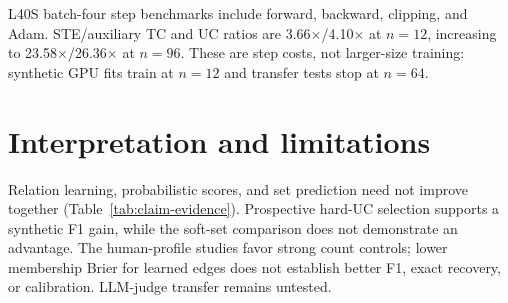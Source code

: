 L40S batch-four step benchmarks include forward, backward, clipping, and Adam. STE/auxiliary TC and UC ratios are 3.66$\times$/4.10$\times$ at $n=12$, increasing to 23.58$\times$/26.36$\times$ at $n=96$. These are step costs, not larger-size training: synthetic GPU fits train at $n=12$ and transfer tests stop at $n=64$.

\section{Interpretation and limitations}\label{sec:discussion}
Relation learning, probabilistic scores, and set prediction need not improve together (Table~\ref{tab:claim-evidence}). Prospective hard-UC selection supports a synthetic F1 gain, while the soft-set comparison does not demonstrate an advantage. The human-profile studies favor strong count controls; lower membership Brier for learned edges does not establish better F1, exact recovery, or calibration. LLM-judge transfer remains untested.

